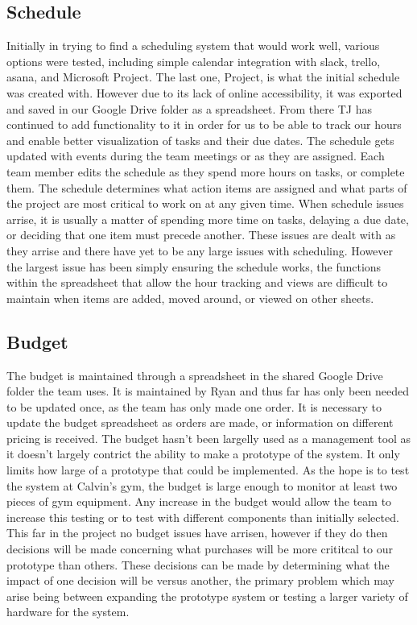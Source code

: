 \documentclass[ppfs.tex]{template/subfiles}
\begin{document}
    \subsection{Schedule}
	Initially in trying to find a scheduling system that would work well, various options were tested, including simple calendar integration with slack, trello, asana, and Microsoft Project. The last one, Project, is what the initial schedule was created with. However due to its lack of online accessibility, it was exported and saved in our Google Drive folder as a spreadsheet. From there TJ has continued to add functionality to it in order for us to be able to track our hours and enable better visualization of tasks and their due dates. The schedule gets updated with events during the team meetings or as they are assigned. Each team member edits the schedule as they spend more hours on tasks, or complete them. The schedule determines what action items are assigned and what parts of the project are most critical to work on at any given time. When schedule issues arrise, it is usually a matter of spending more time on tasks, delaying a due date, or deciding that one item must precede another. These issues are dealt with as they arrise and there have yet to be any large issues with scheduling. However the largest issue has been simply ensuring the schedule works, the functions within the spreadsheet that allow the hour tracking and views are difficult to maintain when items are added, moved around, or viewed on other sheets. 
	
    \subsection{Budget}
    The budget is maintained through a spreadsheet in the shared Google Drive folder the team uses. It is maintained by Ryan and thus far has only been needed to be updated once, as the team has only made one order. It is necessary to update the budget spreadsheet as orders are made, or information on different pricing is received. The budget hasn't been largelly used as a management tool as it doesn't largely contrict the ability to make a prototype of the system. It only limits how large of a prototype that could be implemented. As the hope is to test the system at Calvin's gym, the budget is large enough to monitor at least two pieces of gym equipment. Any increase in the budget would allow the team to increase this testing or to test with different components than initially selected. This far in the project no budget issues have arrisen, however if they do then decisions will be made concerning what purchases will be more crititcal to our prototype than others. These decisions can be made by determining what the impact of one decision will be versus another, the primary problem which may arise being between expanding the prototype system or testing a larger variety of hardware for the system. 
	
\end{document}
